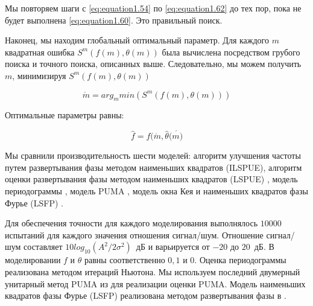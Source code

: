Мы повторяем шаги с \ref{eq:equation1.54} по \ref{eq:equation1.62} до тех пор, пока не будет выполнена \ref{eq:equation1.60}. Это правильный поиск.

Наконец, мы находим глобальный оптимальный параметр. Для каждого $m$ квадратная ошибка $S^m (f (m), \theta (m))$ была вычислена посредством грубого поиска и точного поиска, описанных выше. Следовательно, мы можем получить $m$, минимизируя $S^m (f (m), \theta (m))$

\begin{equation}
	\label{eq:equation1.63}
	\acute{m}= arg_m min(S^m(f(m),\theta(m)))
\end{equation}

Оптимальные параметры равны:

\begin{equation}
	\label{eq:equation1.64}
	\hat{f}=f(\acute{m}, \hat{\theta}(\acute{m)}
\end{equation}

Мы сравнили производительность шести моделей: алгоритм улучшения частоты путем развертывания фазы методом наименьших квадратов (ILSPUE), алгоритм  оценки развертывания фазы методом наименьших квадратов (LSPUE) \cite{7456233}, модель периодограммы \cite{1055282}, 
модель PUMA \cite{7152983, 5356160}, 
модель окна Кея \cite{kay1989fast} и наименьших квадратов фазы Фурье (LSFP) \cite{haniff1991least}. 

Для обеспечения точности для каждого моделирования выполнялось $10000$ испытаний для каждого значения отношения сигнал/шум. Отношение сигнал/шум составляет $10log_{10} (A^2 / 2\sigma^2)$~дБ и варьируется от $-20$ до $20$~дБ. В моделировании $f$ и $\theta$ равны соответственно $0,1$ и $0$. Оценка периодограммы реализована методом итераций Ньютона. Мы используем последний двумерный унитарный метод PUMA из \cite{7152983} для реализации оценки PUMA. Модель наименьших квадратов фазы Фурье (LSFP) реализована методом развертывания фазы в \cite{haniff1991least}.

